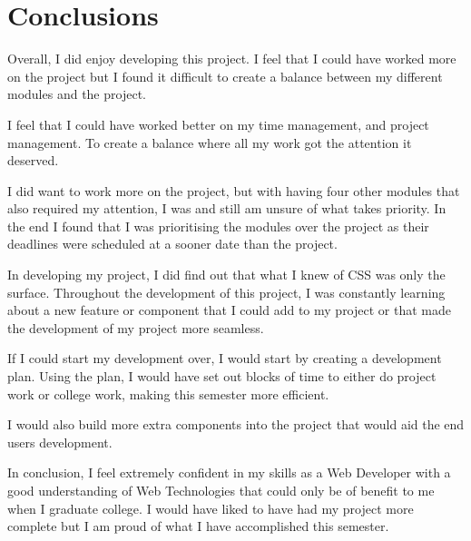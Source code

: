 \newpage
\chapter*{Conclusions}

Overall, I did enjoy developing this project. I feel that I could have worked more on the project but I found it difficult to create a balance between my different modules and the project. 

I feel that I could have worked better on my time management, and project management. To create a balance where all my work got the attention it deserved. 

I did want to work more on the project, but with having four other modules that also required my attention, I was and still am unsure of what takes priority. In the end I found that I was prioritising the modules over the project as their deadlines were scheduled at a sooner date than the project.

In developing my project, I did find out that what I knew of CSS was only the surface. Throughout the development of this project, I was constantly learning about a new feature or component that I could add to my project or that made the development of my project more seamless. 


If I could start my development over, I would start by creating a development plan. Using the plan, I would have set out blocks of time to either do project work or college work, making this semester more efficient. 

I would also build more extra components into the project that would aid the end users development.

 In conclusion, I feel extremely confident in my skills as a Web Developer with a good understanding of Web Technologies that could only be of benefit to me when I graduate college. I would have liked to have had my project more complete but I am proud of what I have accomplished this semester. 
 
 



%
%
 


